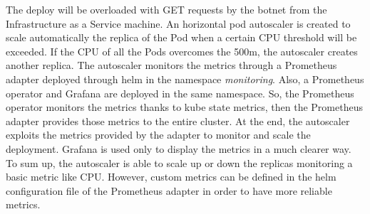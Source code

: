 \documentclass[a4paper]{article}
\begin{document}
The deploy will be overloaded with GET requests by the botnet from the Infrastructure as a Service machine. An horizontal pod autoscaler is created to scale automatically the replica of the Pod when a certain CPU threshold will be exceeded. If the CPU of all the Pods overcomes the 500m, the autoscaler creates another replica. The autoscaler monitors the metrics through a Prometheus adapter deployed through helm in the namespace \textit{monitoring}. Also, a Prometheus operator and Grafana are deployed in the same namespace. So, the Prometheus operator monitors the metrics thanks to kube state metrics, then the Prometheus adapter provides those metrics to the entire cluster. At the end, the autoscaler exploits the metrics provided by the adapter to monitor and scale the deployment. Grafana is used only to display the metrics in a much clearer way.\\
To sum up, the autoscaler is able to scale up or down the replicas monitoring a basic metric like CPU. However, custom metrics can be defined in the helm configuration file of the Prometheus adapter in order to have more reliable metrics.
\end{document}
